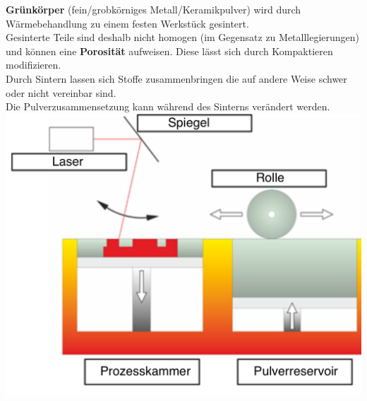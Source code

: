 \textbf{Grünkörper} (fein/grobkörniges Metall/Keramikpulver) wird durch 
Wärmebehandlung zu einem festen Werkstück gesintert.\\
Gesinterte Teile sind deshalb nicht homogen (im Gegensatz zu 
Metalllegierungen) und können eine \textbf{Porosität} aufweisen. Diese lässt 
sich durch Kompaktieren modifizieren.\\
Durch Sintern lassen sich Stoffe zusammenbringen die auf andere 
Weise schwer oder nicht vereinbar sind.\\
Die Pulverzusammensetzung kann während des Sinterns verändert werden.\\

\includegraphics[width =0.6\linewidth]{src/images/Sintern.png}\\

